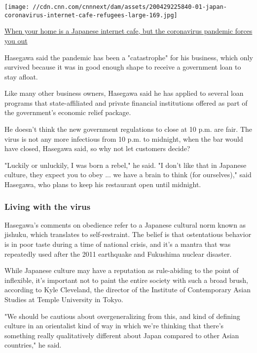 \href{/2020/05/03/asia/japan-coronavirus-internet-cafe-refugee-hnk-intl/index.html}{}

\texttt{[image: //cdn.cnn.com/cnnnext/dam/assets/200429225840-01-japan-coronavirus-internet-cafe-refugees-large-169.jpg]}

\href{/2020/05/03/asia/japan-coronavirus-internet-cafe-refugee-hnk-intl/index.html}{When
your home is a Japanese internet cafe, but the coronavirus pandemic
forces you out}

Hasegawa said the pandemic has been a "catastrophe" for his business,
which only survived because it was in good enough shape to receive a
government loan to stay afloat.

Like many other business owners, Hasegawa said he has applied to several
loan programs that state-affiliated and private financial institutions
offered as part of the government's economic relief package.

He doesn't think the new government regulations to close at 10 p.m. are
fair. The virus is not any more infectious from 10 p.m. to midnight,
when the bar would have closed, Hasegawa said, so why not let customers
decide?

"Luckily or unluckily, I was born a rebel," he said. "I don't like that
in Japanese culture, they expect you to obey ... we have a brain to
think (for ourselves)," said Hasegawa, who plans to keep his restaurant
open until midnight.

\hypertarget{living-with-the-virus}{%
\subsubsection{Living with the virus}\label{living-with-the-virus}}

Hasegawa's comments on obedience refer to a Japanese cultural norm known
as jishuku, which translates to self-restraint. The belief is that
ostentatious behavior is in poor taste during a time of national crisis,
and it's a mantra that was repeatedly used after the 2011 earthquake and
Fukushima nuclear disaster.

While Japanese culture may have a reputation as rule-abiding to the
point of inflexible, it's important not to paint the entire society with
such a broad brush, according to Kyle Cleveland, the director of the
Institute of Contemporary Asian Studies at Temple University in Tokyo.

"We should be cautious about overgeneralizing from this, and kind of
defining culture in an orientalist kind of way in which we're thinking
that there's something really qualitatively different about Japan
compared to other Asian countries," he said.

